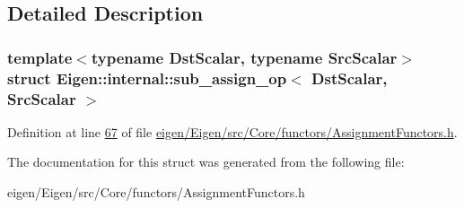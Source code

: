 \subsection{Detailed Description}
\subsubsection*{template$<$typename Dst\+Scalar, typename Src\+Scalar$>$\newline
struct Eigen\+::internal\+::sub\+\_\+assign\+\_\+op$<$ Dst\+Scalar, Src\+Scalar $>$}



Definition at line \hyperlink{eigen_2_eigen_2src_2_core_2functors_2_assignment_functors_8h_source_l00067}{67} of file \hyperlink{eigen_2_eigen_2src_2_core_2functors_2_assignment_functors_8h_source}{eigen/\+Eigen/src/\+Core/functors/\+Assignment\+Functors.\+h}.



The documentation for this struct was generated from the following file\+:\begin{DoxyCompactItemize}
\item 
eigen/\+Eigen/src/\+Core/functors/\+Assignment\+Functors.\+h\end{DoxyCompactItemize}
